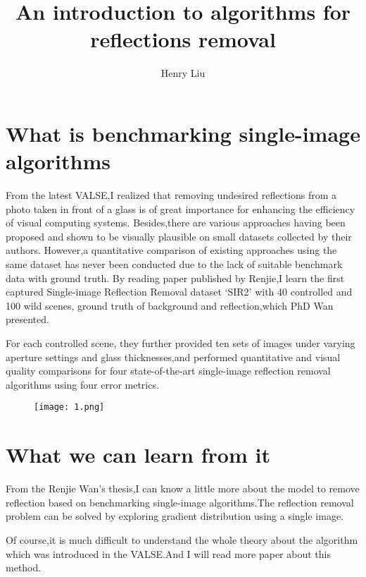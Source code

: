 \documentclass{article}
\author{Henry Liu}
\title{An introduction to algorithms for reflections removal}
\begin{document}
  \maketitle
  \section{What is benchmarking single-image algorithms}
  \par
  From the latest VALSE,I realized that removing undesired reflections from a photo taken in front of a glass is of great importance for enhancing the efficiency of visual computing systems. Besides,there are various approaches having been proposed and shown to be visually plausible on small datasets collected by their authors. However,a quantitative comparison of existing approaches using the same dataset has never been conducted due to the lack of suitable benchmark data with ground truth. By reading paper published by Renjie,I learn the first captured Single-image Reflection Removal dataset `SIR2' with 40 controlled and 100 wild scenes, ground truth of background and reflection,which PhD Wan presented.

  For each controlled scene, they further provided ten sets of images under varying aperture settings and glass thicknesses,and performed quantitative and visual quality comparisons for four state-of-the-art single-image reflection removal algorithms using four error metrics.
\begin{figure}[ht]
\centering
\texttt{[image: 1.png]}
\end{figure}

  \section{What we can learn from it}
  \par
  From the Renjie Wan's thesis,I can know a little more about the model to remove reflection based on benchmarking single-image algorithms.The reflection removal problem can be solved by exploring gradient distribution using a single image.

  Of course,it is much difficult to understand the whole theory about the algorithm which was introduced in the VALSE.And I will read more paper about this method.
\end{document}
